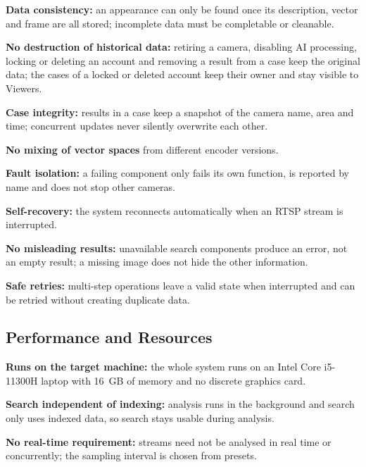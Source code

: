 \begin{reqlist}
    \item[NFR-06] \textbf{Data consistency:} an appearance can only be found once its description, vector and frame are all stored; incomplete data must be completable or cleanable.
    \item[NFR-07] \textbf{No destruction of historical data:} retiring a camera, disabling AI processing, locking or deleting an account and removing a result from a case keep the original data; the cases of a locked or deleted account keep their owner and stay visible to Viewers.
    \item[NFR-08] \textbf{Case integrity:} results in a case keep a snapshot of the camera name, area and time; concurrent updates never silently overwrite each other.
    \item[NFR-09] \textbf{No mixing of vector spaces} from different encoder versions.
    \item[NFR-10] \textbf{Fault isolation:} a failing component only fails its own function, is reported by name and does not stop other cameras.
    \item[NFR-11] \textbf{Self-recovery:} the system reconnects automatically when an RTSP stream is interrupted.
    \item[NFR-12] \textbf{No misleading results:} unavailable search components produce an error, not an empty result; a missing image does not hide the other information.
    \item[NFR-13] \textbf{Safe retries:} multi-step operations leave a valid state when interrupted and can be retried without creating duplicate data.
\end{reqlist}

\subsection{Performance and Resources}
\label{sec:4.3.4}

\begin{reqlist}
    \item[NFR-14] \textbf{Runs on the target machine:} the whole system runs on an Intel Core i5-11300H laptop with 16~GB of memory and no discrete graphics card.
    \item[NFR-15] \textbf{Search independent of indexing:} analysis runs in the background and search only uses indexed data, so search stays usable during analysis.
    \item[NFR-16] \textbf{No real-time requirement:} streams need not be analysed in real time or concurrently; the sampling interval is chosen from presets.
\end{reqlist}

